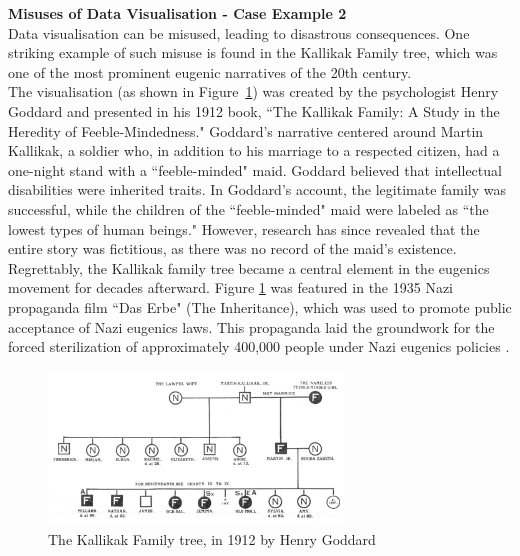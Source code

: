 \documentclass{article}\usepackage[]{graphicx}\usepackage[]{xcolor}
\begin{document}
\noindent 
\textbf{Misuses of Data Visualisation - Case Example 2}\\

\noindent
Data visualisation can be misused, leading to disastrous consequences. One striking example of such misuse is found in the Kallikak Family tree, which was one of the most prominent eugenic narratives of the 20th century.\\

\noindent
The visualisation (as shown in Figure~\ref{fig:familytree}) was created by the psychologist Henry Goddard and presented in his 1912 book, ``The Kallikak Family: A Study in the Heredity of Feeble-Mindedness." Goddard's narrative centered around Martin Kallikak, a soldier who, in addition to his marriage to a respected citizen, had a one-night stand with a ``feeble-minded" maid. Goddard believed that intellectual disabilities were inherited traits. In Goddard's account, the legitimate family was successful, while the children of the ``feeble-minded" maid were labeled as ``the lowest types of human beings." However, research has since revealed that the entire story was fictitious, as there was no record of the maid's existence\cite{fakedata}.\\

\noindent
Regrettably, the Kallikak family tree became a central element in the eugenics movement for decades afterward. Figure \ref{fig:familytree} was featured in the 1935 Nazi propaganda film ``Das Erbe" (The Inheritance), which was used to promote public acceptance of Nazi eugenics laws. This propaganda laid the groundwork for the forced sterilization of approximately 400,000 people under Nazi eugenics policies \cite{eugenics}.

\begin{figure}[H]
    \centering
    \includegraphics[width=0.7\textwidth]{familytree.jpg}
    \caption{The Kallikak Family tree, in 1912 by Henry Goddard\cite{ktree}}
    \label{fig:familytree}
\end{figure}
\end{document}
